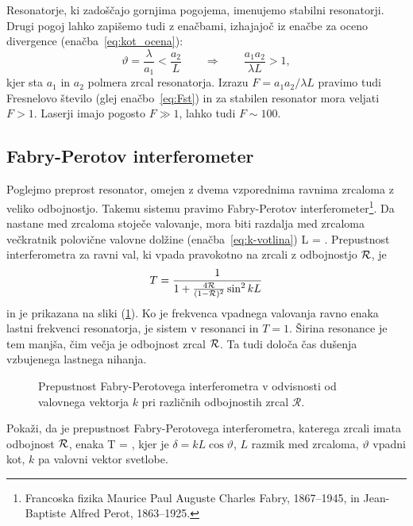 Resonatorje, ki zadoščajo gornjima pogojema, imenujemo stabilni 
resonatorji.
Drugi pogoj lahko zapišemo tudi z enačbami, izhajajoč iz enačbe za oceno divergence (enačba~\ref{eq:kot_ocena}):
\begin{equation}
\vartheta = \frac{\lambda}{a_1} < \frac{a_2}{L} \qquad \Rightarrow \qquad
\frac{a_{1}a_{2}}{\lambda L}>1,
\label{eq:Fresnelovo_stevilo}
\end{equation}
kjer sta $a_{1}$ in $a_{2}$ polmera zrcal resonatorja. Izrazu 
$
F = a_{1}a_{2}/\lambda L
$
pravimo tudi Fresnelovo število (glej enačbo~\ref{eq:Fst})
in za stabilen resonator mora veljati $F>1$. Laserji imajo pogosto $F\gg 1$, lahko tudi $F \sim 100$.

\subsection*{Fabry-Perotov interferometer}
Poglejmo preprost resonator, omejen z dvema vzporednima ravnima zrcaloma
z veliko odbojnostjo. Takemu sistemu pravimo Fabry-Perotov 
interferometer\footnote{Francoska fizika Maurice Paul Auguste Charles Fabry, 1867--1945, in 
Jean-Baptiste Alfred Perot, 1863--1925.}. 
Da nastane med zrcaloma stoječe valovanje, mora biti razdalja 
med zrcaloma večkratnik polovične valovne dolžine (enačba~\ref{eq:k-votlina})
\beq
L = .
\eeq
Prepustnost interferometra za ravni val, ki vpada pravokotno na zrcali z
odbojnostjo ${\cal R}$, je 
\begin{equation}
T=\frac{1}{1+\frac{4{\cal R}}{(1-{\cal R})^{2}}\sin^{2}kL}
\label{eq:Fabry-Perot-prepustnost}
\end{equation}
in je prikazana na sliki (\ref{fig:Fabry-Perot}).
Ko je frekvenca vpadnega valovanja ravno enaka lastni frekvenci
resonatorja, je sistem v resonanci in  $T=1$. Širina resonance je tem manjša, čim
večja je odbojnost zrcal ${\cal R}$. Ta tudi določa čas dušenja vzbujenega
lastnega nihanja.
\begin{figure}[h!]
\centering
\def\svgwidth{85truemm} 

\caption{
Prepustnost Fabry-Perotovega interferometra
v odvisnosti od valovnega vektorja $k$ pri različnih odbojnostih zrcal
$\mathcal{R}.$}
\label{fig:Fabry-Perot}
\end{figure}

\begin{definition}
Pokaži, da je prepustnost Fabry-Perotovega interferometra, katerega zrcali imata odbojnost $\cal{R}$, enaka 
\beq
T = ,
\eeq
kjer je $\delta = kL\cos{\vartheta}$, $L$ razmik med zrcaloma, $\vartheta$ vpadni kot, 
$k$ pa valovni vektor svetlobe.
\end{definition}

